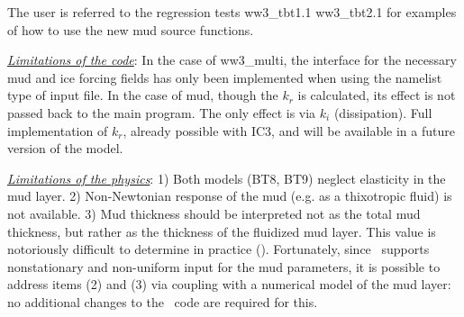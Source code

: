 The user is referred to the regression tests {\file ww3\_tbt1.1} {\file
ww3\_tbt2.1} for examples of how to use the new mud source functions.

\textrm{\textit{\underline{Limitations of the code}}}: In the case of {\file ww3\_multi}, 
the interface for the necessary mud and ice forcing fields has only been implemented when using 
the namelist type of input file.  In the case of mud, though the ${k_r}$ is calculated, its effect is
not passed back to the main program. The only effect is via ${k_i}$
(dissipation). Full implementation of ${k_r}$, already possible with IC3, and
will be available in a future version of the model.

\textrm{\textit{\underline{Limitations of the physics}}}: 1) Both models
({\code BT8}, {\code BT9}) neglect elasticity in the mud layer. 2)
Non-Newtonian response of the mud (e.g. as a thixotropic fluid) is not
available. 3) Mud thickness should be interpreted not as the total mud
thickness, but rather as the thickness of the fluidized mud layer. This value
is notoriously difficult to determine in practice
(\cite{art:RH09}). Fortunately, since \ws\ supports nonstationary and
non-uniform input for the mud parameters, it is possible to address items (2)
and (3) via coupling with a numerical model of the mud layer: no additional
changes to the \ws\ code are required for this.
